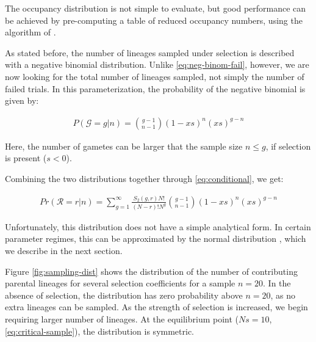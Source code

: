 \documentclass[review]{elsarticle}
\begin{document}
The occupancy distribution is not simple to evaluate, but good performance can be achieved by
pre-computing a table of reduced occupancy numbers, using the algorithm of \cite{ONeill2019}.

As stated before, the number of lineages sampled under selection is described with a negative
binomial distribution. Unlike \ref{eq:neg-binom-fail}, however, we are now looking for the total
number of lineages sampled, not simply the number of failed trials. In this parameterization, the
probability of the negative binomial is given by:

\begin{align}
  \label{eq:neg-binomial-trials}
  P(\mathcal{G}=g|n) = \binom{g-1}{n-1}(1-xs)^n(xs)^{g-n}
\end{align}

Here, the number of gametes can be larger that the sample size $n \le g$, if selection is present
($s<0$).

Combining the two distributions together through \ref{eq:conditional}, we get:

\begin{align}
  \label{eq:lineages-in-past}
   Pr(\mathcal{R}=r|n) = \sum_{g=1}^{\infty} \frac{S_2(g,r) N!}{(N-r)! N^g} \binom{g-1}{n-1}(1-xs)^n(xs)^{g-n}
\end{align}

Unfortunately, this distribution does not have a simple analytical form. In certain parameter
regimes, this can be approximated by the normal distribution \citep{JohnsonEtAl2005,ONeill2019},
which we describe in the next section.

Figure \ref{fig:sampling-dist} shows the distribution of the number of contributing parental
lineages for several selection coefficients for a sample $n=20$. In the absence of selection, the
distribution has zero probability above $n=20$, as no extra lineages can be sampled. As the strength
of selection is increased, we begin requiring larger number of lineages. At the equilibrium point
($Ns=10$, \eqref{eq:critical-sample}), the distribution is symmetric.
\end{document}
